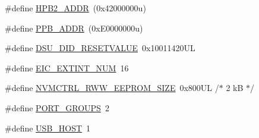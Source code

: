 \begin{DoxyCompactItemize}
\item 
\#define \mbox{\hyperlink{group___s_a_m_d21_j16_b__definitions_gaef42fa53ddf169a2a50be70d29f73571}{H\+P\+B2\+\_\+\+A\+D\+DR}}~(0x42000000u)
\item 
\#define \mbox{\hyperlink{group___s_a_m_d21_j16_b__definitions_ga8895d0a3a9a3126cc44330f86c8ce564}{P\+P\+B\+\_\+\+A\+D\+DR}}~(0x\+E0000000u)
\item 
\#define \mbox{\hyperlink{group___s_a_m_d21_j16_b__definitions_gada75131d542c9e1966238f5488f89bd6}{D\+S\+U\+\_\+\+D\+I\+D\+\_\+\+R\+E\+S\+E\+T\+V\+A\+L\+UE}}~0x10011420\+UL
\item 
\#define \mbox{\hyperlink{group___s_a_m_d21_j16_b__definitions_ga88ebc38c95506296f5d21f82476296ae}{E\+I\+C\+\_\+\+E\+X\+T\+I\+N\+T\+\_\+\+N\+UM}}~16
\item 
\#define \mbox{\hyperlink{group___s_a_m_d21_j16_b__definitions_gacb7a115808eeb0b50bd55888f9ba65ae}{N\+V\+M\+C\+T\+R\+L\+\_\+\+R\+W\+W\+\_\+\+E\+E\+P\+R\+O\+M\+\_\+\+S\+I\+ZE}}~0x800\+U\+L /$\ast$ 2 k\+B $\ast$/
\item 
\#define \mbox{\hyperlink{group___s_a_m_d21_j16_b__definitions_gab9243ffe03a1dc631b57a495b4b3d467}{P\+O\+R\+T\+\_\+\+G\+R\+O\+U\+PS}}~2
\item 
\#define \mbox{\hyperlink{group___s_a_m_d21_j16_b__definitions_ga856aa08fb33114928cbc8635be1792e4}{U\+S\+B\+\_\+\+H\+O\+ST}}~1
\end{DoxyCompactItemize}
